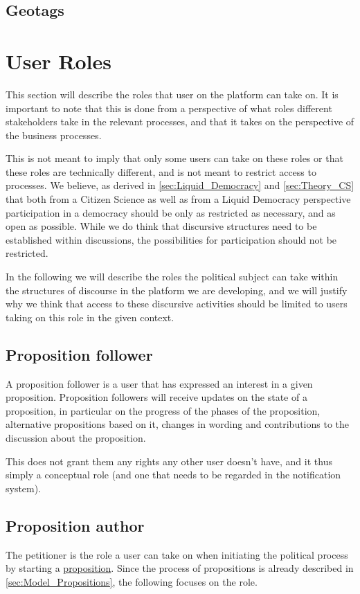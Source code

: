 \subsection{Geotags}

\section{User Roles}
\label{sec:UserRoles}
This section will describe the roles that user on the platform can take on.
It is important to note that this is done from a perspective of what roles different stakeholders take in the relevant processes, and that it takes on the perspective of the business processes.

This is not meant to imply that only some users can take on these roles or that these roles are technically different, and is not meant to restrict access to processes. We believe, as derived in \ref{sec:Liquid_Democracy} and \ref{sec:Theory_CS} that both from a Citizen Science as well as from a Liquid Democracy perspective participation in a democracy should be only as restricted as necessary, and as open as possible. While we do think that discursive structures need to be established within discussions, the possibilities for participation should not be restricted.

In the following we will describe the roles the political subject can take within the structures of discourse in the platform we are developing, and we will justify why we think that access to these discursive activities should be limited to users taking on this role in the given context.

\subsection{Proposition follower}
A proposition follower is a user that has expressed an interest in a given proposition. Proposition followers will receive updates on the state of a proposition, in particular on the progress of the phases of the proposition, alternative propositions based on it, changes in wording and contributions to the discussion about the proposition.

This does not grant them any rights any other user doesn't have, and it thus simply a conceptual role (and one that needs to be regarded in the notification system).

\subsection{Proposition author}
\label{ssec:Roles_Petitioner}
The petitioner is the role a user can take on when initiating the political process by starting a \hyperref[sec:Model_Propositions]{proposition}. Since the process of propositions is already described in \ref{sec:Model_Propositions}, the following focuses on the role.

